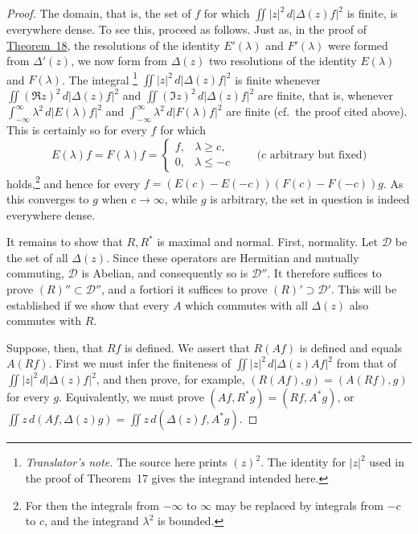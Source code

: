 \documentclass[
  paper=b5,
  twoside=true,
  fontsize=13pt,
  headings=normal,
  bookmarkpackage=false
]{scrartcl}
\theoremstyle{definition}
\newcommand{\TheoremRef}[1]{\hyperref[thm:#1]{Theorem~#1}}
\newcounter{translatornote}
\newcounter{savedfootnote}
\newcommand{\TranslatorNote}[1]{%
  \stepcounter{translatornote}%
  \setcounter{savedfootnote}{\value{footnote}}%
  \begingroup
    \renewcommand{\thefootnote}{T\arabic{translatornote}}%
    \footnote{\textit{Translator's note.} #1}%
  \endgroup
  \setcounter{footnote}{\value{savedfootnote}}}
\begin{document}
\begin{proof}
The domain, that is, the set of \(f\) for which
\(\iint \lvert z\rvert^{2}\,d\lvert\Delta(z)f\rvert^{2}\) is finite, is
everywhere dense.  To see this, proceed as follows.  Just as, in the proof
of \TheoremRef{18}, the resolutions of the identity \(E'(\lambda)\) and
\(F'(\lambda)\) were formed from \(\Delta'(z)\), we now form from
\(\Delta(z)\) two resolutions of the identity \(E(\lambda)\) and
\(F(\lambda)\).  The integral\TranslatorNote{The source here prints
\((z)^2\). The identity for \(\lvert z\rvert^2\) used in the proof of
Theorem~17 gives the integrand intended here.}
\(\iint \lvert z\rvert^{2}\,d\lvert\Delta(z)f\rvert^{2}\) is finite whenever
\(\iint (\Re z)^{2}\,d\lvert\Delta(z)f\rvert^{2}\) and
\(\iint (\Im z)^{2}\,d\lvert\Delta(z)f\rvert^{2}\) are finite, that is,
whenever \(\int_{-\infty}^{\infty}\lambda^{2}\,d\lvert E(\lambda)f\rvert^{2}\)
and \(\int_{-\infty}^{\infty}\lambda^{2}\,d\lvert F(\lambda)f\rvert^{2}\)
are finite (cf.\ the proof cited above).  This is certainly so for every
\(f\) for which
\[
  E(\lambda)f=F(\lambda)f=
  \begin{cases}
    f,& \lambda\geq c,\\
    0,& \lambda\leq -c
  \end{cases}
  \qquad
  \text{(\(c\) arbitrary but fixed)}
\]
holds,\footnote{\label{fn:68}For then the integrals from \(-\infty\) to \(\infty\) may
be replaced by integrals from \(-c\) to \(c\), and the integrand
\(\lambda^{2}\) is bounded.}
and hence for every \(f=(E(c)-E(-c))(F(c)-F(-c))g\).  As this converges to \(g\) when \(c\to\infty\), while \(g\) is arbitrary,
the set in question is indeed everywhere dense.

It remains to show that \(R,R^{*}\) is maximal and normal.  First,
normality.  Let \(\mathcal D\) be the set of all \(\Delta(z)\).  Since these
operators are Hermitian and mutually commuting, \(\mathcal D\) is Abelian,
and consequently so is \(\mathcal D''\).  It therefore suffices to prove \((R)''\subset\mathcal D''\),
and a fortiori it suffices to prove \((R)'\supset\mathcal D'\).  This will
be established if we show that every \(A\) which commutes with all
\(\Delta(z)\) also commutes with \(R\).

Suppose, then, that \(Rf\) is defined.  We assert that \(R(Af)\) is
defined and equals \(A(Rf)\).  First we must infer the finiteness of
\(\iint\lvert z\rvert^{2}\,d\lvert\Delta(z)Af\rvert^{2}\)
from that of \(\iint\lvert z\rvert^{2}\,d\lvert\Delta(z)f\rvert^{2}\),
and then prove, for example, \((R(Af),g)=(A(Rf),g)\) for every \(g\).
Equivalently, we must prove \((Af,R^{*}g)=(Rf,A^{*}g)\), or
\(\iint z\,d(Af,\Delta(z)g)=\iint z\,d(\Delta(z)f,A^{*}g)\).


\end{proof}
\end{document}
